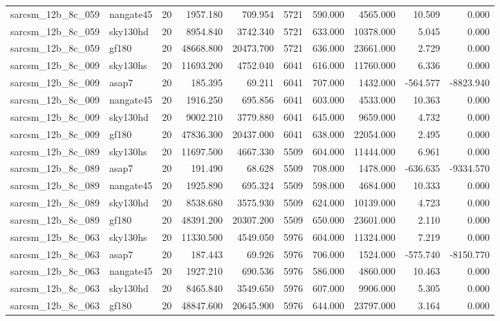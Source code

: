 \documentclass{article}
\begin{document}
\begin{longtable}{llrrrrrrrr}
sarcsm\_12b\_8c\_059 & nangate45 & 20 & 1957.180 & 709.954 & 5721 & 590.000 & 4565.000 & 10.509 & 0.000 \\
sarcsm\_12b\_8c\_059 & sky130hd & 20 & 8954.840 & 3742.340 & 5721 & 633.000 & 10378.000 & 5.045 & 0.000 \\
sarcsm\_12b\_8c\_059 & gf180 & 20 & 48668.800 & 20473.700 & 5721 & 636.000 & 23661.000 & 2.729 & 0.000 \\
sarcsm\_12b\_8c\_009 & sky130hs & 20 & 11693.200 & 4752.040 & 6041 & 616.000 & 11760.000 & 6.336 & 0.000 \\
sarcsm\_12b\_8c\_009 & asap7 & 20 & 185.395 & 69.211 & 6041 & 707.000 & 1432.000 & -564.577 & -8823.940 \\
sarcsm\_12b\_8c\_009 & nangate45 & 20 & 1916.250 & 695.856 & 6041 & 603.000 & 4533.000 & 10.363 & 0.000 \\
sarcsm\_12b\_8c\_009 & sky130hd & 20 & 9002.210 & 3779.880 & 6041 & 645.000 & 9659.000 & 4.732 & 0.000 \\
sarcsm\_12b\_8c\_009 & gf180 & 20 & 47836.300 & 20437.000 & 6041 & 638.000 & 22054.000 & 2.495 & 0.000 \\
sarcsm\_12b\_8c\_089 & sky130hs & 20 & 11697.500 & 4667.330 & 5509 & 604.000 & 11444.000 & 6.961 & 0.000 \\
sarcsm\_12b\_8c\_089 & asap7 & 20 & 191.490 & 68.628 & 5509 & 708.000 & 1478.000 & -636.635 & -9334.570 \\
sarcsm\_12b\_8c\_089 & nangate45 & 20 & 1925.890 & 695.324 & 5509 & 598.000 & 4684.000 & 10.333 & 0.000 \\
sarcsm\_12b\_8c\_089 & sky130hd & 20 & 8538.680 & 3575.930 & 5509 & 624.000 & 10139.000 & 4.723 & 0.000 \\
sarcsm\_12b\_8c\_089 & gf180 & 20 & 48391.200 & 20307.200 & 5509 & 650.000 & 23601.000 & 2.110 & 0.000 \\
sarcsm\_12b\_8c\_063 & sky130hs & 20 & 11330.500 & 4549.050 & 5976 & 604.000 & 11324.000 & 7.219 & 0.000 \\
sarcsm\_12b\_8c\_063 & asap7 & 20 & 187.443 & 69.926 & 5976 & 706.000 & 1524.000 & -575.740 & -8150.770 \\
sarcsm\_12b\_8c\_063 & nangate45 & 20 & 1927.210 & 690.536 & 5976 & 586.000 & 4860.000 & 10.463 & 0.000 \\
sarcsm\_12b\_8c\_063 & sky130hd & 20 & 8465.840 & 3549.650 & 5976 & 607.000 & 9906.000 & 5.305 & 0.000 \\
sarcsm\_12b\_8c\_063 & gf180 & 20 & 48847.600 & 20645.900 & 5976 & 644.000 & 23797.000 & 3.164 & 0.000 \\

\end{longtable}
\end{document}
